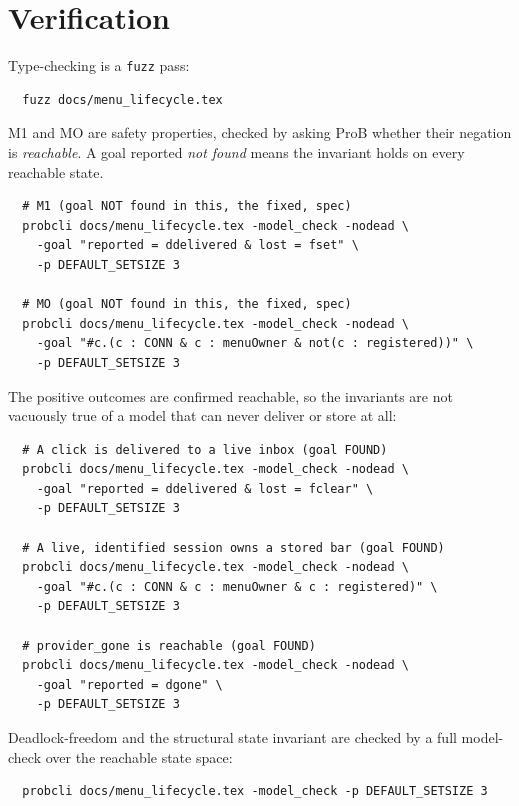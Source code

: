 \documentclass[a4paper,10pt,fleqn]{article}
\begin{document}
\section{Verification}
\label{sec:verify}

Type-checking is a \texttt{fuzz} pass:
\begin{verbatim}
  fuzz docs/menu_lifecycle.tex
\end{verbatim}

M1 and MO are safety properties, checked by asking ProB whether their
negation is \emph{reachable}. A goal reported \emph{not found} means the
invariant holds on every reachable state.

\begin{verbatim}
  # M1 (goal NOT found in this, the fixed, spec)
  probcli docs/menu_lifecycle.tex -model_check -nodead \
    -goal "reported = ddelivered & lost = fset" \
    -p DEFAULT_SETSIZE 3

  # MO (goal NOT found in this, the fixed, spec)
  probcli docs/menu_lifecycle.tex -model_check -nodead \
    -goal "#c.(c : CONN & c : menuOwner & not(c : registered))" \
    -p DEFAULT_SETSIZE 3
\end{verbatim}

The positive outcomes are confirmed reachable, so the invariants are not
vacuously true of a model that can never deliver or store at all:

\begin{verbatim}
  # A click is delivered to a live inbox (goal FOUND)
  probcli docs/menu_lifecycle.tex -model_check -nodead \
    -goal "reported = ddelivered & lost = fclear" \
    -p DEFAULT_SETSIZE 3

  # A live, identified session owns a stored bar (goal FOUND)
  probcli docs/menu_lifecycle.tex -model_check -nodead \
    -goal "#c.(c : CONN & c : menuOwner & c : registered)" \
    -p DEFAULT_SETSIZE 3

  # provider_gone is reachable (goal FOUND)
  probcli docs/menu_lifecycle.tex -model_check -nodead \
    -goal "reported = dgone" \
    -p DEFAULT_SETSIZE 3
\end{verbatim}

Deadlock-freedom and the structural state invariant are checked by a full
model-check over the reachable state space:

\begin{verbatim}
  probcli docs/menu_lifecycle.tex -model_check -p DEFAULT_SETSIZE 3
\end{verbatim}
\end{document}
